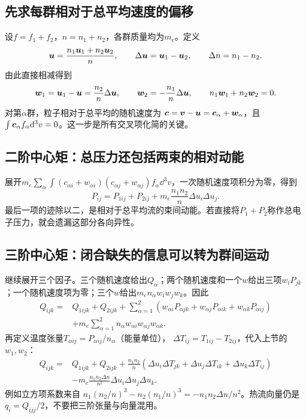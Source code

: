 \subsection{先求每群相对于总平均速度的偏移}
设$f=f_1+f_2$，$n=n_1+n_2$，各群质量均为$m_e$。定义
\begin{equation}
 \bm{u}=\frac{n_1\bm{u}_1+n_2\bm{u}_2}{n},\qquad
 \Delta\bm{u}=\bm{u}_1-\bm{u}_2,\qquad \Delta n=n_1-n_2.
\end{equation}
由此直接相减得到
\begin{equation}
 \bm{w}_1=\bm{u}_1-\bm{u}=\frac{n_2}{n}\Delta\bm{u},
 \qquad \bm{w}_2=-\frac{n_1}{n}\Delta\bm{u},
 \qquad n_1\bm{w}_1+n_2\bm{w}_2=0.
\end{equation}
对第$\alpha$群，粒子相对于总平均的随机速度为
$\bm{c}=\bm{v}-\bm{u}=\bm{c}_\alpha+\bm{w}_\alpha$，且
$\int\bm{c}_\alpha f_\alpha\mathrm d^3v=0$。这一步是所有交叉项化简的关键。

\subsection{二阶中心矩：总压力还包括两束的相对动能}
展开$m_e\sum_\alpha\int(c_{\alpha i}+w_{\alpha i})
(c_{\alpha j}+w_{\alpha j})f_\alpha\dd^3v$，一次随机速度项积分为零，得到
\begin{equation}
 P_{ij}=P_{1ij}+P_{2ij}
 +m_e\frac{n_1n_2}{n}\Delta u_i\Delta u_j.
 \label{eq:mixture_pressure}
\end{equation}
最后一项的迹除以二，是相对于总平均流的束间动能。若直接将$P_1+P_2$称作总电子压力，就会遗漏这部分各向异性。

\subsection{三阶中心矩：闭合缺失的信息可以转为群间运动}
继续展开三个因子。三个随机速度给出$Q_\alpha$；两个随机速度和一个$w$给出三项$w_iP_{jk}$；一个随机速度项为零；三个$w$给出$m_en_\alpha w_iw_jw_k$。因此
\begin{align}
 Q_{ijk}={}&Q_{1ijk}+Q_{2ijk}
 +\sum_{\alpha=1}^2
 \left(w_{\alpha i}P_{\alpha jk}+w_{\alpha j}P_{\alpha ik}
       +w_{\alpha k}P_{\alpha ij}\right)\nonumber\\
 &+m_e\sum_{\alpha=1}^2n_\alpha w_{\alpha i}w_{\alpha j}w_{\alpha k}.
\end{align}
再定义温度张量$T_{\alpha ij}=P_{\alpha ij}/n_\alpha$（能量单位），
$\Delta T_{ij}=T_{1ij}-T_{2ij}$，代入上节的$w_1,w_2$：
\begin{align}
 Q_{ijk}={}&Q_{1ijk}+Q_{2ijk}
 +\frac{n_1n_2}{n}
 \left(\Delta u_i\Delta T_{jk}+\Delta u_j\Delta T_{ik}
                       +\Delta u_k\Delta T_{ij}\right)\nonumber\\
 &-m_e\frac{n_1n_2\Delta n}{n^2}
       \Delta u_i\Delta u_j\Delta u_k.
 \label{eq:mixture_heat}
\end{align}
例如立方项系数来自
$n_1(n_2/n)^3-n_2(n_1/n)^3
=-n_1n_2\Delta n/n^2$。热流向量仍是$q_i=Q_{ijj}/2$，不要把三阶张量与向量混用。

